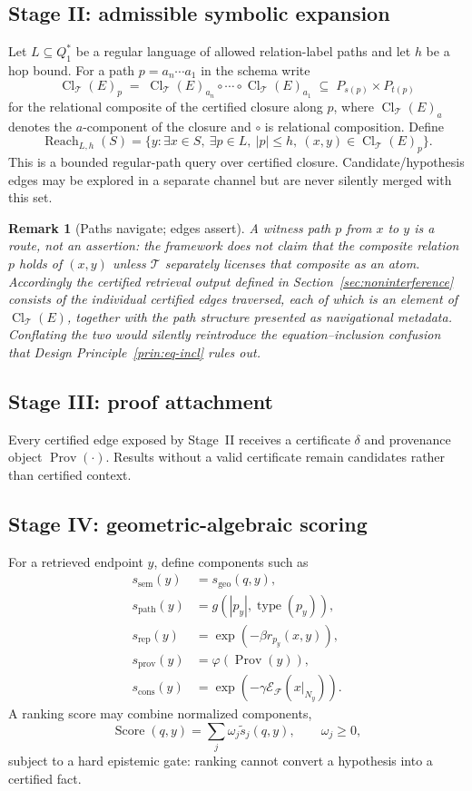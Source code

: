 \documentclass[11pt]{article}
\newtheorem{remark}[definition]{Remark}
\newcommand{\Cl}{\operatorname{Cl}}
\newcommand{\Score}{\operatorname{Score}}
\newcommand{\Prov}{\operatorname{Prov}}
\newcommand{\Reach}{\operatorname{Reach}}
\newcommand{\Energy}{\mathcal{E}}
\newcommand{\T}{\mathcal{T}}
\newcommand{\F}{\mathcal{F}}
\begin{document}
\subsection{Stage II: admissible symbolic expansion}
Let $L\subseteq Q_1^{\ast}$ be a regular language of allowed relation-label paths and let $h$ be a hop bound. For a path $p=a_n\cdots a_1$ in the schema write
\[
\Cl_{\T}(E)_p \;=\; \Cl_{\T}(E)_{a_n}\circ\cdots\circ\Cl_{\T}(E)_{a_1}
\;\subseteq\; P_{s(p)}\times P_{t(p)}
\]
for the relational composite of the certified closure along $p$, where $\Cl_{\T}(E)_a$ denotes the $a$-component of the closure and $\circ$ is relational composition. Define
\[
\Reach_{L,h}(S)=
\{y:\exists x\in S,\ \exists p\in L,\ |p|\le h,\ (x,y)\in \Cl_{\T}(E)_p\}.
\]
This is a bounded regular-path query over certified closure. Candidate/hypothesis edges may be explored in a separate channel but are never silently merged with this set.

\begin{remark}[Paths navigate; edges assert]
\label{rem:paths-vs-edges}
A witness path $p$ from $x$ to $y$ is a route, not an assertion: the framework does \emph{not} claim that the composite relation $p$ holds of $(x,y)$ unless $\T$ separately licenses that composite as an atom. Accordingly the certified retrieval output defined in Section~\ref{sec:noninterference} consists of the individual certified \emph{edges} traversed, each of which is an element of $\Cl_{\T}(E)$, together with the path structure presented as navigational metadata. Conflating the two would silently reintroduce the equation--inclusion confusion that Design Principle~\ref{prin:eq-incl} rules out.
\end{remark}

\subsection{Stage III: proof attachment}
Every certified edge exposed by Stage~II receives a certificate $\delta$ and provenance object $\Prov(\cdot)$. Results without a valid certificate remain candidates rather than certified context.

\subsection{Stage IV: geometric-algebraic scoring}
For a retrieved endpoint $y$, define components such as
\[
\begin{aligned}
s_{\mathrm{sem}}(y)&=s_{\mathrm{geo}}(q,y),\\
s_{\mathrm{path}}(y)&=g(|p_y|,\operatorname{type}(p_y)),\\
s_{\mathrm{rep}}(y)&=\exp(-\beta r_{p_y}(x,y)),\\
s_{\mathrm{prov}}(y)&=\varphi(\Prov(y)),\\
s_{\mathrm{cons}}(y)&=\exp(-\gamma \Energy_{\F}(x|_{N_y})).
\end{aligned}
\]
A ranking score may combine normalized components,
\[
\Score(q,y)=\sum_{j}\omega_j \widetilde{s}_j(q,y),
\qquad \omega_j\ge0,
\]
subject to a hard epistemic gate: ranking cannot convert a hypothesis into a certified fact.
\end{document}
